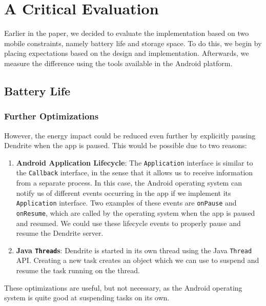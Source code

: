 \chapter{A Critical Evaluation}\label{chp:a_critical_evaluation}
Earlier in the paper, we decided to evaluate the implementation based on two mobile constraints, namely battery life and storage space.
To do this, we begin by placing expectations based on the design and implementation.
Afterwards, we measure the difference using the tools available in the Android platform.

\section{Battery Life}\label{sec:battery_life}


\subsection{Further Optimizations}
However, the energy impact could be reduced even further by explicitly pausing Dendrite when the app is paused.
This would be possible due to two reasons:
\begin{enumerate}
	\item{
	      \textbf{Android Application Lifecycle}:
	      The \texttt{Application} interface is similar to the \texttt{Callback} interface, in the sense that it allows us to receive information from a separate process.
	      In this case, the Android operating system can notify us of different events occurring in the app if we implement its \texttt{Application} interface.
	      Two examples of these events are \texttt{onPause} and \texttt{onResume}, which are called by the operating system when the app is paused and resumed.
	      We could use these lifecycle events to properly pause and resume the Dendrite server.
	      }
	\item{
	      \textbf{Java \texttt{Thread}s}:
	      Dendrite is started in its own thread using the Java \texttt{Thread} \ac{API}\@.
	      Creating a new task creates an object which we can use to suspend and resume the task running on the thread.
	      }
\end{enumerate}

These optimizations are useful, but not necessary, as the Android operating system is quite good at suspending tasks on its own.

